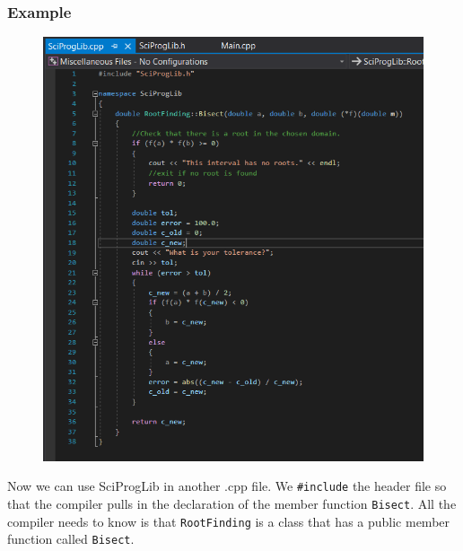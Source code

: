 \documentclass{if-beamer}
\begin{document}
\begin{frame}
	\begin{minipage}{0.5\textwidth}
		\frametitle{Example}
		\begin{figure}
			\centering
			\includegraphics[width = \textwidth]{figures/cppfile}
		\end{figure}
	\end{minipage}
	\begin{minipage}{0.5\textwidth}
		Now we can use SciProgLib in another .cpp file. We \texttt{\#include} the header file so that the compiler pulls in the declaration of the member function \texttt{Bisect}. All the compiler needs to know is that \texttt{RootFinding} is a class that has a public member function called \texttt{Bisect}.
	\end{minipage}
	
\end{frame}
\end{document}
